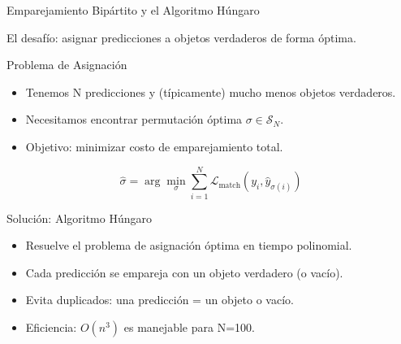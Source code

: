 \documentclass[aspectratio=169, 10pt]{beamer}
\begin{document}
\begin{frame}[shrink]{Emparejamiento Bip\'artito y el Algoritmo H\'ungaro}

	El desaf\'io: asignar predicciones a objetos verdaderos de forma \'optima.

	\vspace{0.3cm}

	\begin{block}{Problema de Asignaci\'on}
		\begin{itemize}
			\item Tenemos N predicciones y (t\'ipicamente) mucho menos objetos verdaderos.
			\item Necesitamos encontrar permutaci\'on \'optima $\sigma \in \mathcal{S}_N$.
			\item Objetivo: minimizar costo de emparejamiento total.
		\end{itemize}
	\end{block}

	\vspace{0.2cm}

	{\small
	\[
	\hat{\sigma} = \arg\min_{\sigma} \sum_{i=1}^{N} \mathcal{L}_{\text{match}}(y_i, \hat{y}_{\sigma(i)})
	\]
	}

	\begin{block}{Soluci\'on: Algoritmo H\'ungaro}
		\begin{itemize}
			\item Resuelve el problema de asignaci\'on \'optima en tiempo polinomial.
			\item Cada predicci\'on se empareja con un objeto verdadero (o vac\'io).
			\item Evita duplicados: una predicci\'on = un objeto o vac\'io.
			\item Eficiencia: $O(n^3)$ es manejable para N=100.
		\end{itemize}
	\end{block}

\end{frame}
\end{document}
